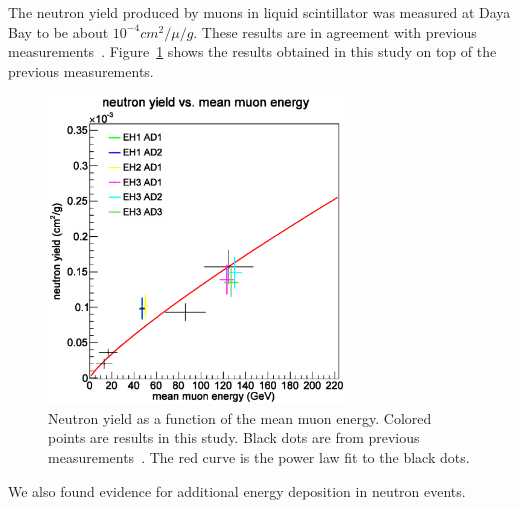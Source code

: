 The neutron yield produced by muons in liquid scintillator was measured at Daya Bay to be about $10^{-4} cm^2/\mu/g$. These results are in agreement with previous measurements~\cite{Agafonova2013}. Figure~\ref{fig:neutron_yield_chap8} shows the results obtained in this study on top of the previous measurements.
\begin{figure}
	\centering
	\includegraphics[width=0.7\textwidth]{figures/chap8/neutron_yield.eps}
	\caption[Neutron yield as a function of the mean muon energy. Colored points are results in this study. Black dots are from previous measurements. The red curve is the power law fit to the black dots.]{Neutron yield as a function of the mean muon energy. Colored points are results in this study. Black dots are from previous measurements~\cite{Agafonova2013}. The red curve is the power law fit to the black dots.}
	\label{fig:neutron_yield_chap8}
\end{figure}
We also found evidence for additional energy deposition in neutron events.


